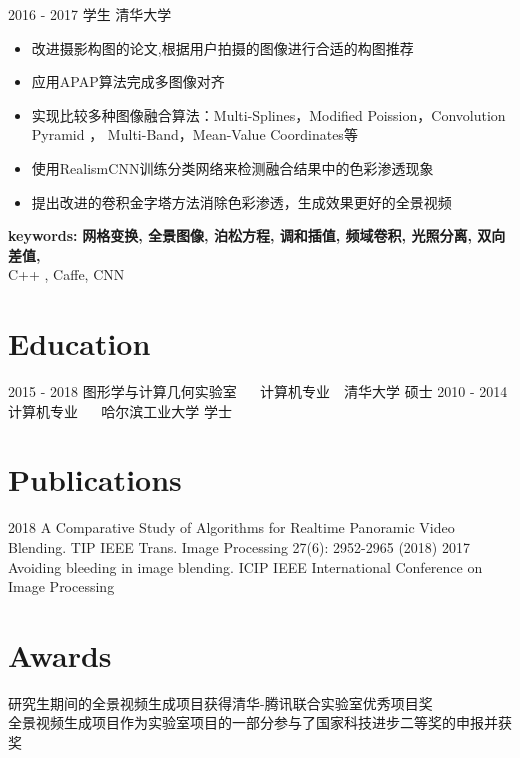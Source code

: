 \documentclass[]{cv-style} %
\begin{document}
\begin{entrylist}
\entry
  {2016 - 2017}
  {学生}
  {清华大学}
  {
    \vspace{-5pt}
    \leftmargini=-1cm
    \begin{itemize}
      \setlength{\itemsep}{3pt}
      \item {改进摄影构图的论文,根据用户拍摄的图像进行合适的构图推荐}
      \item {应用APAP算法完成多图像对齐}
      \item {实现比较多种图像融合算法：Multi-Splines，Modified Poission，Convolution\\ Pyramid
      ， Multi-Band，Mean-Value Coordinates等}
      \item {使用RealismCNN训练分类网络来检测融合结果中的色彩渗透现象}
      \item {提出改进的卷积金字塔方法消除色彩渗透，生成效果更好的全景视频}
    \end{itemize}
    \vspace{5pt}
    \hspace{-1.2cm} \textbf{keywords:} \textbf{网格变换, 全景图像, 泊松方程, 调和插值, 频域卷积, 光照分离, 双向差值,}\\ {C++ , Caffe, CNN}
}

\end{entrylist}
\vspace{-10pt}
\section{Education}
\begin{entrylist}
\vspace{-10pt}
\entry
{2015 - 2018}
{图形学与计算几何实验室 {\normalfont ~~ 计算机专业~~清华大学}}
{ 硕士}
{}
\vspace{-10pt}
\entry
{2010 - 2014}
{计算机专业 {\normalfont ~~ 哈尔滨工业大学}}
{ 学士}
{ }
\end{entrylist}
\vspace{-5pt} 
\section{Publications}
\begin{entrylist}
\entry
{2018}
{A Comparative Study of Algorithms for Realtime Panoramic Video Blending.}
{TIP}
{ IEEE Trans. Image Processing 27(6): 2952-2965 (2018)}
\entry
{2017}
{Avoiding bleeding in image blending.}
{ICIP}
{IEEE International Conference on Image Processing}
\end{entrylist}
\vspace{-10pt}
\section{Awards}
\begin{entrylist}
  \vspace{5pt}
   \hspace{0.2cm}研究生期间的全景视频生成项目获得清华-腾讯联合实验室优秀项目奖\\
   \hspace{0.2cm}全景视频生成项目作为实验室项目的一部分参与了国家科技进步二等奖的申报并获奖
\end{entrylist}
\end{document}
